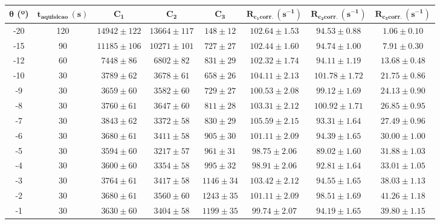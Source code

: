 \documentclass[8pt,a4paper,portuguese]{extarticle}
\begin{document}
\begin{table}[htbp]
\begin{tabular}{c|c|c|c|c|c|c|c}
\hline
\hline
\textbf{$\boldsymbol\theta$ (º)} & $\mathbf{t_{aquisicao} \, (s)}$ & $\mathbf{C_1}$ & $\mathbf{C_2}$ & $\mathbf{C_3}$ & $\mathbf{R_{c_1corr.} \, (s^{-1})}$ & $\mathbf{R_{c_2corr.} \, (s^{-1})}$ & $\mathbf{R_{c_3corr.} \, (s^{-1})}$ \\ \hline \hline
-20 & 120 & $ 14942 \pm 122 $ & $ 13664 \pm 117 $ & $ 148 \pm 12 $ & $ 102.64 \pm 1.53 $ & $ 94.53 \pm 0.88 $ & $ 1.06 \pm 0.10 $ \\ \hline
-15 & 90 & $ 11185 \pm 106 $ & $ 10271 \pm 101 $ & $ 727 \pm 27 $ & $ 102.44 \pm 1.60 $ & $ 94.74 \pm 1.00 $ & $ 7.91 \pm 0.30 $ \\ \hline
-12 & 60 & $ 7448 \pm 86 $ & $ 6802 \pm 82 $ & $ 831 \pm 29 $ & $ 102.32 \pm 1.74 $ & $ 94.11 \pm 1.19 $ & $ 13.68 \pm 0.48 $ \\ \hline
-10 & 30 & $ 3789 \pm 62 $ & $ 3678 \pm 61 $ & $ 658 \pm 26 $ & $ 104.11 \pm 2.13 $ & $ 101.78 \pm 1.72 $ & $ 21.75 \pm 0.86 $ \\ \hline
-9 & 30 & $ 3659 \pm 60 $ & $ 3582 \pm 60 $ & $ 729 \pm 27 $ & $ 100.53 \pm 2.08 $ & $ 99.12 \pm 1.69 $ & $ 24.13 \pm 0.90 $ \\ \hline
-8 & 30 & $ 3760 \pm 61 $ & $ 3647 \pm 60 $ & $ 811 \pm 28 $ & $ 103.31 \pm 2.12 $ & $ 100.92 \pm 1.71 $ & $ 26.85 \pm 0.95 $ \\ \hline
-7 & 30 & $ 3843 \pm 62 $ & $ 3372 \pm 58 $ & $ 830 \pm 29 $ & $ 105.59 \pm 2.15 $ & $ 93.31 \pm 1.64 $ & $ 27.49 \pm 0.96 $ \\ \hline
-6 & 30 & $ 3680 \pm 61 $ & $ 3411 \pm 58 $ & $ 905 \pm 30 $ & $ 101.11 \pm 2.09 $ & $ 94.39 \pm 1.65 $ & $ 30.00 \pm 1.00 $ \\ \hline
-5 & 30 & $ 3594 \pm 60 $ & $ 3217 \pm 57 $ & $ 961 \pm 31 $ & $ 98.75 \pm 2.06 $ & $ 89.02 \pm 1.60 $ & $ 31.88 \pm 1.03 $ \\ \hline
-4 & 30 & $ 3600 \pm 60 $ & $ 3354 \pm 58 $ & $ 995 \pm 32 $ & $ 98.91 \pm 2.06 $ & $ 92.81 \pm 1.64 $ & $ 33.01 \pm 1.05 $ \\ \hline
-3 & 30 & $ 3764 \pm 61 $ & $ 3417 \pm 58 $ & $ 1146 \pm 34 $ & $ 103.42 \pm 2.12 $ & $ 94.55 \pm 1.65 $ & $ 38.03 \pm 1.13 $ \\ \hline
-2 & 30 & $ 3680 \pm 61 $ & $ 3560 \pm 60 $ & $ 1243 \pm 35 $ & $ 101.11 \pm 2.09 $ & $ 98.51 \pm 1.69 $ & $ 41.26 \pm 1.18 $ \\ \hline
-1 & 30 & $ 3630 \pm 60 $ & $ 3404 \pm 58 $ & $ 1199 \pm 35 $ & $ 99.74 \pm 2.07 $ & $ 94.19 \pm 1.65 $ & $ 39.80 \pm 1.15 $ \\ \hline

\end{tabular}
\end{table}
\end{document}
